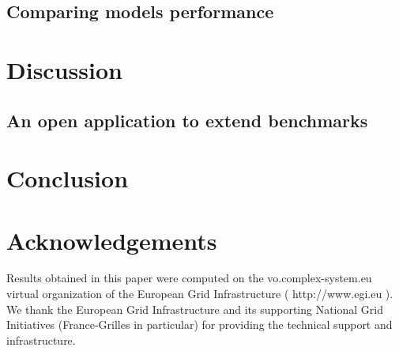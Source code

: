 \documentclass[alpha-refs]{wiley-article}
\begin{document}
\subsection{Comparing models performance}




\section{Discussion}


\subsection{An open application to extend benchmarks}







\section{Conclusion}





\section*{Acknowledgements}

Results obtained in this paper were computed on the vo.complex-system.eu virtual organization of the European Grid Infrastructure ( http://www.egi.eu ). We thank the European Grid Infrastructure and its supporting National Grid Initiatives (France-Grilles in particular) for providing the technical support and infrastructure.







\end{document}
